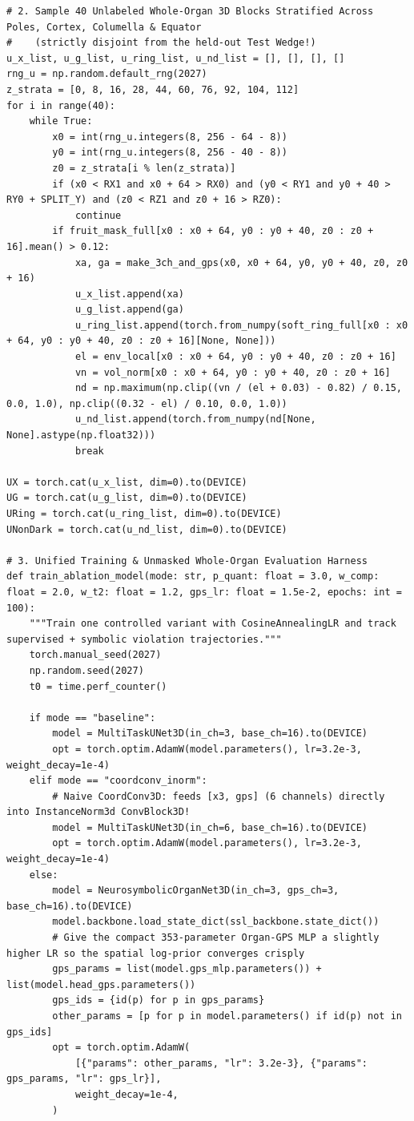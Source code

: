 \documentclass[10pt,a4paper]{article}
\begin{document}
\begin{codebox}[{In [4] $\cdot$ Python --- Step 4 -- Controlled 5-model ablation study (SSL warm-start, Organ-GPS, p=1 vs p=3, calibration)}]
\begin{lstlisting}[style=pybmed]
# 2. Sample 40 Unlabeled Whole-Organ 3D Blocks Stratified Across Poles, Cortex, Columella & Equator
#    (strictly disjoint from the held-out Test Wedge!)
u_x_list, u_g_list, u_ring_list, u_nd_list = [], [], [], []
rng_u = np.random.default_rng(2027)
z_strata = [0, 8, 16, 28, 44, 60, 76, 92, 104, 112]
for i in range(40):
    while True:
        x0 = int(rng_u.integers(8, 256 - 64 - 8))
        y0 = int(rng_u.integers(8, 256 - 40 - 8))
        z0 = z_strata[i % len(z_strata)]
        if (x0 < RX1 and x0 + 64 > RX0) and (y0 < RY1 and y0 + 40 > RY0 + SPLIT_Y) and (z0 < RZ1 and z0 + 16 > RZ0):
            continue
        if fruit_mask_full[x0 : x0 + 64, y0 : y0 + 40, z0 : z0 + 16].mean() > 0.12:
            xa, ga = make_3ch_and_gps(x0, x0 + 64, y0, y0 + 40, z0, z0 + 16)
            u_x_list.append(xa)
            u_g_list.append(ga)
            u_ring_list.append(torch.from_numpy(soft_ring_full[x0 : x0 + 64, y0 : y0 + 40, z0 : z0 + 16][None, None]))
            el = env_local[x0 : x0 + 64, y0 : y0 + 40, z0 : z0 + 16]
            vn = vol_norm[x0 : x0 + 64, y0 : y0 + 40, z0 : z0 + 16]
            nd = np.maximum(np.clip((vn / (el + 0.03) - 0.82) / 0.15, 0.0, 1.0), np.clip((0.32 - el) / 0.10, 0.0, 1.0))
            u_nd_list.append(torch.from_numpy(nd[None, None].astype(np.float32)))
            break

UX = torch.cat(u_x_list, dim=0).to(DEVICE)
UG = torch.cat(u_g_list, dim=0).to(DEVICE)
URing = torch.cat(u_ring_list, dim=0).to(DEVICE)
UNonDark = torch.cat(u_nd_list, dim=0).to(DEVICE)

# 3. Unified Training & Unmasked Whole-Organ Evaluation Harness
def train_ablation_model(mode: str, p_quant: float = 3.0, w_comp: float = 2.0, w_t2: float = 1.2, gps_lr: float = 1.5e-2, epochs: int = 100):
    """Train one controlled variant with CosineAnnealingLR and track supervised + symbolic violation trajectories."""
    torch.manual_seed(2027)
    np.random.seed(2027)
    t0 = time.perf_counter()

    if mode == "baseline":
        model = MultiTaskUNet3D(in_ch=3, base_ch=16).to(DEVICE)
        opt = torch.optim.AdamW(model.parameters(), lr=3.2e-3, weight_decay=1e-4)
    elif mode == "coordconv_inorm":
        # Naive CoordConv3D: feeds [x3, gps] (6 channels) directly into InstanceNorm3d ConvBlock3D!
        model = MultiTaskUNet3D(in_ch=6, base_ch=16).to(DEVICE)
        opt = torch.optim.AdamW(model.parameters(), lr=3.2e-3, weight_decay=1e-4)
    else:
        model = NeurosymbolicOrganNet3D(in_ch=3, gps_ch=3, base_ch=16).to(DEVICE)
        model.backbone.load_state_dict(ssl_backbone.state_dict())
        # Give the compact 353-parameter Organ-GPS MLP a slightly higher LR so the spatial log-prior converges crisply
        gps_params = list(model.gps_mlp.parameters()) + list(model.head_gps.parameters())
        gps_ids = {id(p) for p in gps_params}
        other_params = [p for p in model.parameters() if id(p) not in gps_ids]
        opt = torch.optim.AdamW(
            [{"params": other_params, "lr": 3.2e-3}, {"params": gps_params, "lr": gps_lr}],
            weight_decay=1e-4,
        )


\end{lstlisting}
\end{codebox}
\end{document}
